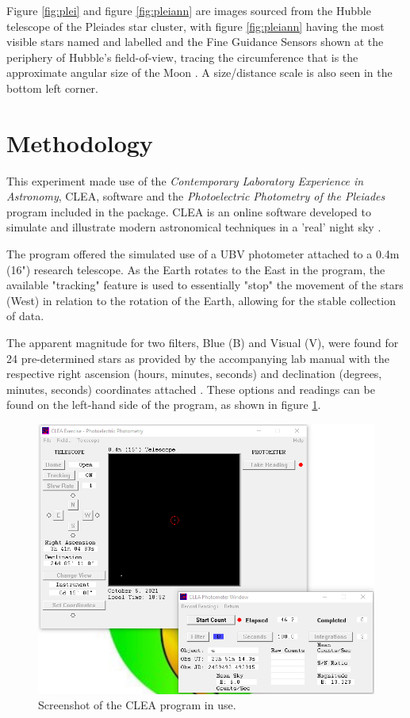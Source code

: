 \documentclass[12pt]{article}
\begin{document}
Figure \ref{fig:plei} and figure \ref{fig:pleiann} are images sourced from the Hubble telescope of the Pleiades star cluster, with figure \ref{fig:pleiann} having the most visible stars named and labelled
and the Fine Guidance Sensors shown at the periphery of Hubble's field-of-view, tracing the circumference that is the approximate angular size of the Moon \cite{pleiadesann}.
A size/distance scale is also seen in the bottom left corner.

\section{Methodology} \label{sec:2}

This experiment made use of the \textit{Contemporary Laboratory Experience in Astronomy}, CLEA, software and the \textit{Photoelectric Photometry of the Pleiades} program included in the package.
CLEA is an online software developed to simulate and illustrate modern astronomical techniques in a 'real' night sky
\cite{cleasm}.

The program offered the simulated use of a UBV photometer attached to a 0.4m (16") research telescope. As the Earth rotates to the East in the program, the available "tracking" feature is used to essentially "stop"
the movement of the stars (West) in relation to the rotation of the Earth, allowing for the stable collection of data.

The apparent magnitude for two filters, Blue (B) and Visual (V), were found for 24 pre-determined stars as provided by the accompanying lab manual with the respective
right ascension (hours, minutes, seconds) and declination (degrees, minutes, seconds) coordinates attached \cite{UCDsm}.
These options and readings can be found on the left-hand side of the program, as shown in figure \ref{fig:program}.

\begin{figure}[H]
    \centering
    \includegraphics[width=.9\linewidth]{SMscreenshot_program.png}
    \caption{\centering Screenshot of the CLEA program in use.}
    \label{fig:program}
\end{figure}
\end{document}
